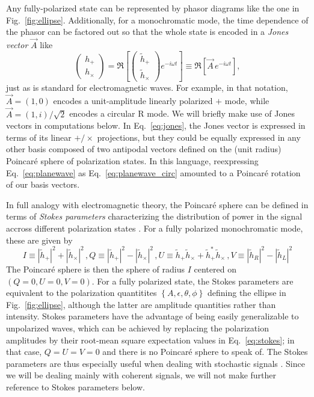 \documentclass[aps,prd,twocolumn,superscriptaddress,preprintnumbers,floatfix,nofootinbib]{revtex4-2}
\newcommand{\beq}{\begin{equation}}
\newcommand{\eeq}{\end{equation}}
\newcommand*{\eq}[1]{Eq.~\eqref{eq:#1}}
\begin{document}
Any fully-polarized state can be represented by phasor diagrams like the one in Fig.~\ref{fig:ellipse}.
Additionally, for a monochromatic mode, the time dependence of the phasor can be factored out so that the whole state is encoded in a \emph{Jones vector} $\vec{A}$ like
\beq \label{eq:jones}
\begin{pmatrix}
h_+\\
h_\times
\end{pmatrix} = 
\Re \left[ \begin{pmatrix}
\tilde{h}_+\\
\tilde{h}_\times
\end{pmatrix} e^{-i\omega t}\right] \equiv
\Re \left[ \vec{A}\, e^{-i\omega t}\right] ,
\eeq
just as is standard for electromagnetic waves.
For example, in that notation, $\vec{A}=\left(1, 0\right)$ encodes a unit-amplitude linearly polarized $+$ mode, while $\vec{A} = \left(1,i\right)/\sqrt{2}$ encodes a circular R mode.
We will briefly make use of Jones vectors in computations below.
In \eq{jones}, the Jones vector is expressed in terms of its linear $+/\times$ projections, but they could be equally expressed in any other basis composed of two antipodal vectors defined on the (unit radius) Poincar\'{e} sphere of polarization states.
In this language, reexpressing Eq.~\eqref{eq:planewave} as Eq.~\eqref{eq:planewave_circ} amounted to a Poincar\'{e} rotation of our basis vectors.

In full analogy with electromagnetic theory, the Poincar\'{e} sphere can be defined in terms of \emph{Stokes parameters} characterizing the distribution of power in the signal accross different polarization states \cite{Anile1974}.
For a fully polarized monochromatic mode, these are given by
\begin{subequations} \label{eq:stokes}
\beq
I \equiv |\tilde{h}_+|^2 + |\tilde{h}_\times|^2  \, ,
\eeq
\beq
Q \equiv |\tilde{h}_+|^2 - |\tilde{h}_\times|^2  \, , 
\eeq
\beq
U \equiv \tilde{h}_+ \tilde{h}_\times + \tilde{h}_+^* \tilde{h}_\times \,  ,
\eeq
\beq
V \equiv |\tilde{h}_R|^2 - |\tilde{h}_L|^2 \eeq
\end{subequations}
The Poincar\'{e} sphere is then the sphere of radius $I$ centered on $\left(Q=0, U=0, V=0\right)$.
For a fully polarized state, the Stokes parameters are equivalent to the polarization quantitites $\left\{A, \epsilon, \theta, \phi\right\}$ defining the ellipse in Fig.~\ref{fig:ellipse}, although the latter are amplitude quantities rather than intensity.
Stokes parameters have the advantage of being easily generalizable to unpolarized waves, which can be achieved by replacing the polarization amplitudes by their root-mean square expectation values in Eq.~\eqref{eq:stokes}; in that case, $Q=U=V=0$ and there is no Poincar\'{e} sphere to speak of.
The Stokes parameters are thus especially useful when dealing with stochastic signals \cite{Romano:2016dpx}.
Since we will be dealing mainly with coherent signals, we will not make further reference to Stokes parameters below.
\end{document}
